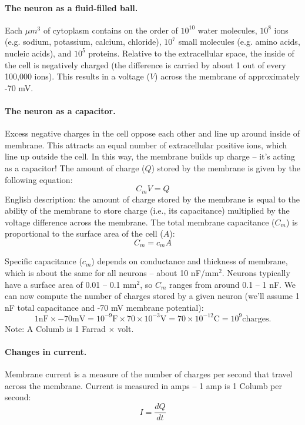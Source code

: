 \documentclass[12pt]{article}
\begin{document}
\paragraph{The neuron as a fluid-filled ball.}  Each $\mu m^3$ of cytoplasm contains on the order of $10^{10}$ water molecules, $10^8$ ions (e.g. sodium, potassium, calcium, chloride), $10^7$ small molecules (e.g. amino acids, nucleic acids), and $10^5$ proteins.  Relative to the extracellular space, the inside of the cell is negatively charged (the difference is carried by about 1 out of every 100,000 ions).  This results in a voltage ($V$) across the membrane of approximately -70 mV.

\paragraph{The neuron as a capacitor.}  Excess negative charges in the cell oppose each other and line up around inside of membrane.  This attracts an equal number of extracellular positive ions, which line up outside the cell.  In this way, the membrane builds up charge -- it's acting as a capacitor!  The amount of charge ($Q$) stored by the membrane is given by the following equation:
\[
C_mV = Q
\]
English description: the amount of charge stored by the membrane is equal to the ability of the membrane to store charge (i.e., its capacitance) multiplied by the voltage difference across the membrane.  The total membrane capacitance ($C_m$) is proportional to the surface area of the cell ($A$):
\[
C_m = c_mA
\]

Specific capacitance ($c_m$) depends on conductance and thickness of membrane, which is about the same for all neurons -- about 10 nF/mm$^2$.  Neurons typically have a surface area of 0.01 -- 0.1 mm$^2$, so $C_m$ ranges from around 0.1 -- 1 nF.  We can now compute the number of charges stored by a given neuron (we'll assume 1 nF total capacitance and -70 mV membrane potential):
\[
1 \mathrm{nF} \times -70 \mathrm{mV} = 10^{-9} \mathrm{F} \times 70 \times 10^{-3} \mathrm{V} = 70 \times 10^{-12} \mathrm{C} = 10^9 \mathrm{charges}.
\]
Note: A Columb is 1 Farrad $\times$ volt.

\paragraph{Changes in current.}  Membrane current is a measure of the number of charges per second that travel across the membrane.  Current is measured in amps -- 1 amp is 1 Columb per second:
\[
I = \frac{dQ}{dt}
\]
\end{document}
